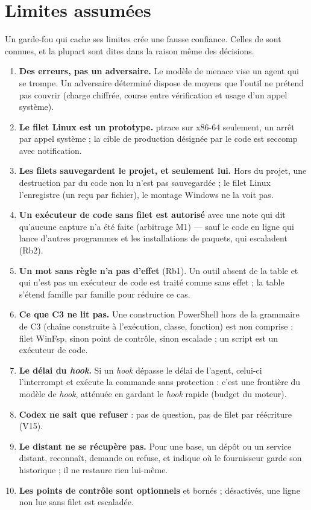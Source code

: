 \section{Limites assumées}
\label{sec:limites}

Un garde-fou qui cache ses limites crée une fausse confiance. Celles de \demo{} sont
connues, et la plupart sont dites dans la raison même des décisions.

\begin{enumerate}
  \item \textbf{Des erreurs, pas un adversaire.} Le modèle de menace vise un agent qui se trompe.
    Un adversaire déterminé dispose de moyens que l'outil ne prétend pas couvrir (charge
    chiffrée, course entre vérification et usage d'un appel système).
  \item \textbf{Le filet Linux est un prototype.} ptrace sur x86-64 seulement, un arrêt par appel
    système ; la cible de production désignée par le code est seccomp avec notification.
  \item \textbf{Les filets sauvegardent le projet, et seulement lui.} Hors du projet, une
    destruction par du code non lu n'est pas sauvegardée ; le filet Linux l'enregistre (un reçu
    par fichier), le montage Windows ne la voit pas.
  \item \textbf{Un exécuteur de code sans filet est autorisé} avec une note qui dit qu'aucune
    capture n'a été faite (arbitrage M1) --- sauf le code en ligne qui lance d'autres programmes
    et les installations de paquets, qui escaladent (Rb2).
  \item \textbf{Un mot sans règle n'a pas d'effet} (Rb1). Un outil absent de la table et qui n'est
    pas un exécuteur de code est traité comme sans effet ; la table s'étend famille par famille
    pour réduire ce cas.
  \item \textbf{Ce que C3 ne lit pas.} Une construction PowerShell hors de la grammaire de C3
    (chaîne construite à l'exécution, classe, fonction) est non comprise : filet WinFsp, sinon
    point de contrôle, sinon escalade ; un script  est un exécuteur de code.
  \item \textbf{Le délai du \textit{hook}.} Si un \textit{hook} dépasse le délai de l'agent, celui-ci
    l'interrompt et exécute la commande sans protection : c'est une frontière du modèle de
    \textit{hook}, atténuée en gardant le \textit{hook} rapide (budget du moteur).
  \item \textbf{Codex ne sait que refuser} : pas de question, pas de filet par réécriture (V15).
  \item \textbf{Le distant ne se récupère pas.} Pour une base, un dépôt ou un service distant,
    \demo{} reconnaît, demande ou refuse, et indique où le fournisseur garde son historique ;
    il ne restaure rien lui-même.
  \item \textbf{Les points de contrôle sont optionnels} et bornés ; désactivés, une ligne non lue
    sans filet est escaladée.
\end{enumerate}

